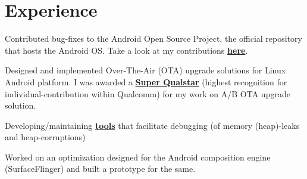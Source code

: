 \documentclass[]{deedy-resume-openfont}
\begin{document}
\hfill
\begin{minipage}[t]{0.66\textwidth} 


\section{Experience}
\vspace{\topsep} %
\begin{tightemize}
\item Contributed bug-fixes to the Android Open Source Project, the official repository that hosts the Android OS. Take a look at my contributions \textbf{\href{https://android-review.googlesource.com/q/shibing}{here}}.
\item Designed and implemented Over-The-Air (OTA) upgrade solutions for Linux Android platform. I was awarded a \textbf{\href{https://www.slideshare.net/slideshow/embed_code/key/uhvsweQaLamkiG} {Super Qualstar}} (highest recognition for individual-contribution within Qualcomm) for my work on A/B OTA upgrade solution.
\item Developing/maintaining \textbf{\href{https://source.codeaurora.org/quic/la/platform/bionic/commit/?h=android-framework.lnx.3.1&id=0c0fee17b7f39e841f6ef5d305adb1d5189dfb25}{tools}} that facilitate debugging (of memory (heap)-leaks and heap-corruptions)
\end{tightemize}
\sectionsep

\vspace{\topsep} %
\begin{tightemize}
\item Worked on an optimization designed for the Android composition engine (SurfaceFlinger) and built a prototype for the same.
\end{tightemize}
\sectionsep



\end{minipage}
\end{document}
